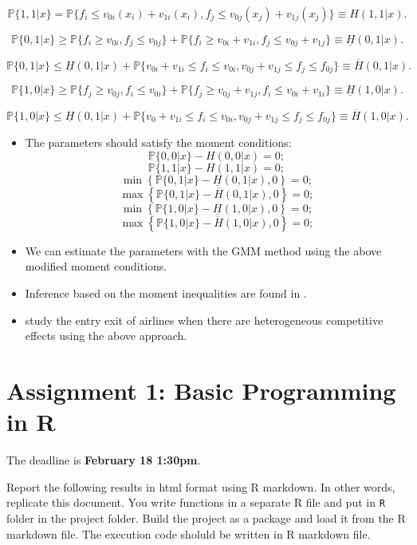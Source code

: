 \documentclass[]{book}
\providecommand{\tightlist}{%
  \setlength{\itemsep}{0pt}\setlength{\parskip}{0pt}}
\begin{document}
\[
\mathbb{P}\{1, 1|x\} = \mathbb{P}\{f_{i} \le v_{0i}(x_{i}) + v_{1i}(x_{i}), f_{j} \le v_{0j}(x_{j}) + v_{1j}(x_{j}) \} \equiv H(1, 1|x).
\]

\[
\mathbb{P}\{0, 1|x\} \ge \mathbb{P}\{f_{i} \ge v_{0i}, f_{j} \le v_{0j}\} + \mathbb{P}\{f_{i} \ge v_{0i} + v_{1i}, f_{j} \le v_{0j} + v_{1j}\} \equiv \underline{H}(0, 1|x).
\]

\[
\mathbb{P}\{0, 1|x\} \le \underline{H}(0, 1|x) + \mathbb{P}\{v_{0i} + v_{1i} \le f_{i} \le v_{0i}, v_{0j} + v_{1j} \le f_{j} \le f_{0j}\} \equiv \overline{H}(0, 1|x).
\]

\[
\mathbb{P}\{1, 0|x\} \ge \mathbb{P}\{f_{j} \ge v_{0j}, f_{i} \le v_{0i}\} + \mathbb{P}\{f_{j} \ge v_{0j} + v_{1j}, f_{i} \le v_{0i} + v_{1i}\} \equiv \underline{H}(1, 0|x).
\]

\[
\mathbb{P}\{1, 0|x\} \le \underline{H}(0, 1|x) + \mathbb{P}\{v_{0} + v_{1i} \le f_{i} \le v_{0i}, v_{0j} + v_{1j} \le f_{j} \le f_{0j}\} \equiv \overline{H}(1, 0|x).
\]

\begin{itemize}
\tightlist
\item
  The parameters should satisfy the moment conditions: \[
  \mathbb{P}\{0, 0|x\} - H(0, 0|x) = 0;
  \] \[
  \mathbb{P}\{1, 1|x\} - H(1, 1|x) = 0;
  \] \[
  \min\left\{\mathbb{P}\{0, 1|x\} - \underline{H}(0, 1|x), 0\right\} = 0;
  \] \[
  \max\left\{\mathbb{P}\{0, 1|x\} - \overline{H}(0, 1|x), 0\right\} = 0;
  \] \[
  \min\left\{\mathbb{P}\{1, 0|x\} - \underline{H}(1, 0|x), 0\right\} = 0;
  \] \[
  \max\left\{\mathbb{P}\{1, 0|x\} - \overline{H}(1, 0|x), 0\right\} = 0;
  \]
\item
  We can estimate the parameters with the GMM method using the above
  modified moment conditions.
\item
  Inference based on the moment inequalities are found in
  \citet{andrews_inference_2010}.
\item
  \citet{ciliberto_market_2009} study the entry exit of airlines when
  there are heterogeneous competitive effects using the above approach.
\end{itemize}

\chapter{Assignment 1: Basic Programming in R}\label{assignment1}

The deadline is \textbf{February 18 1:30pm}.

Report the following results in html format using R markdown. In other
words, replicate this document. You write functions in a separate R file
and put in \texttt{R} folder in the project folder. Build the project as
a package and load it from the R markdown file. The execution code
sholuld be written in R markdown file.
\end{document}
